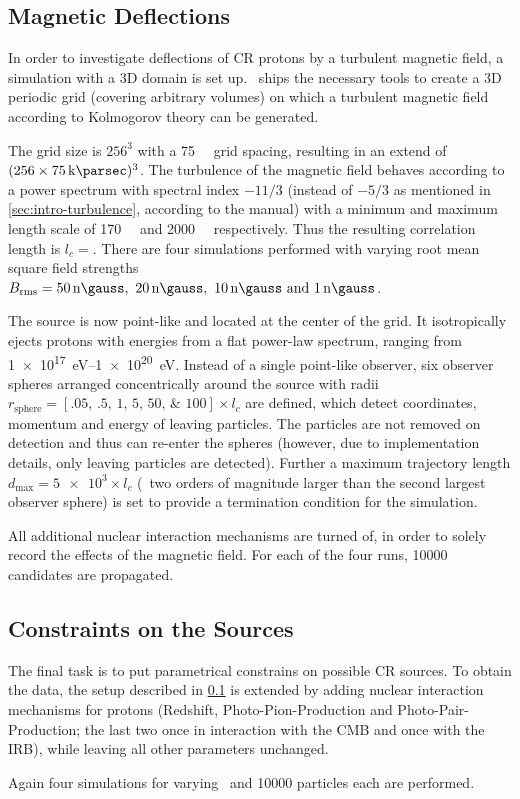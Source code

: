 \subsection{Magnetic Deflections}
\label{sec:setup-defl}
In order to investigate deflections of CR protons by a turbulent
magnetic field, a simulation with a 3D domain is set up. \CRPropa~ships the
necessary tools to create a 3D periodic grid (covering arbitrary volumes) on
which a turbulent magnetic field according to Kolmogorov theory can be
generated.

The grid size is $256^3$ with a \SI{75}{\kilo\parsec} grid spacing, resulting
in an extend of $(256\times\SI{75}{\kilo\parsec})^3$. The turbulence of the
magnetic field behaves according to a power spectrum with spectral index
$-11/3$ (instead of $-5/3$ as mentioned in \cref{sec:intro-turbulence},
according to the manual) with a minimum and maximum length scale of
\SI{170}{\kilo\parsec} and \SI{2000}{\kilo\parsec} respectively. Thus the
resulting correlation length is $l_c=$.
There are four simulations performed with varying root mean square field
strengths $\Brms=\SIlist{50;20;10;1}{\nano\gauss}$.

The source is now point-like and located at the center of the grid. It
isotropically ejects protons with energies from a flat power-law spectrum,
ranging from \SIrange{1e17}{1e20}{\electronvolt}. Instead of a single
point-like observer, six observer spheres arranged concentrically around the
source with radii
$r_{\mathrm{sphere}}=[\numlist[list-final-separator={,}]{.05;.5;1;5;50;100}]\times
l_c$ are defined, which detect coordinates, momentum and
energy of leaving particles. The particles are not removed on detection and
thus can re-enter the spheres (however, due to implementation details, only
leaving particles are detected). Further a maximum trajectory length
$d_{\mathrm{max}}=\num{5e3}\times l_c$ (\ie~two orders of magnitude larger than
the second largest observer sphere) is set to provide a termination condition
for the simulation.

All additional nuclear interaction mechanisms are turned of, in order to solely
record the effects of the magnetic field.
For each of the four runs, \num{10000} candidates are propagated.


\subsection{Constraints on the Sources}
The final task is to put parametrical constrains on possible CR sources. To
obtain the data, the setup described in \cref{sec:setup-defl} is extended by
adding nuclear interaction mechanisms for protons (Redshift,
Photo-Pion-Production and Photo-Pair-Production; the last two once in
interaction with the CMB and once with the IRB), while leaving all other
parameters unchanged.

Again four simulations for varying \Brms~and \num{10000} particles each are
performed.


